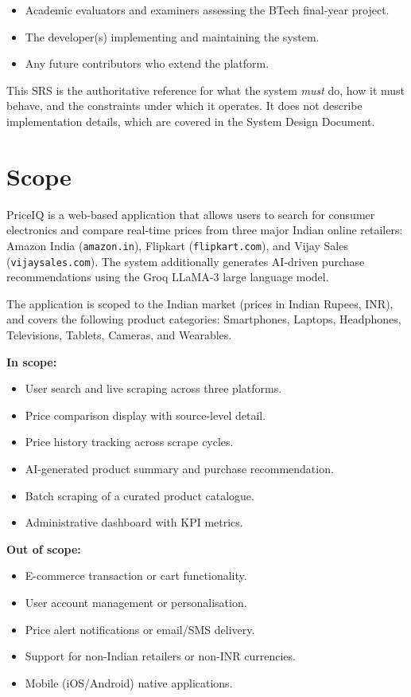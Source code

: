\documentclass[12pt,a4paper]{report}
\begin{document}
\begin{itemize}[noitemsep]
  \item Academic evaluators and examiners assessing the BTech final-year project.
  \item The developer(s) implementing and maintaining the system.
  \item Any future contributors who extend the platform.
\end{itemize}

This SRS is the authoritative reference for what the system \emph{must} do, how
it must behave, and the constraints under which it operates. It does not describe
implementation details, which are covered in the System Design Document.

\section{Scope}
PriceIQ is a web-based application that allows users to search for consumer
electronics and compare real-time prices from three major Indian online retailers:
Amazon India (\texttt{amazon.in}), Flipkart (\texttt{flipkart.com}), and Vijay
Sales (\texttt{vijaysales.com}). The system additionally generates AI-driven
purchase recommendations using the Groq LLaMA-3 large language model.

The application is scoped to the Indian market (prices in Indian Rupees, INR),
and covers the following product categories: Smartphones, Laptops, Headphones,
Televisions, Tablets, Cameras, and Wearables.

\textbf{In scope:}
\begin{itemize}[noitemsep]
  \item User search and live scraping across three platforms.
  \item Price comparison display with source-level detail.
  \item Price history tracking across scrape cycles.
  \item AI-generated product summary and purchase recommendation.
  \item Batch scraping of a curated product catalogue.
  \item Administrative dashboard with KPI metrics.
\end{itemize}

\textbf{Out of scope:}
\begin{itemize}[noitemsep]
  \item E-commerce transaction or cart functionality.
  \item User account management or personalisation.
  \item Price alert notifications or email/SMS delivery.
  \item Support for non-Indian retailers or non-INR currencies.
  \item Mobile (iOS/Android) native applications.
\end{itemize}
\end{document}
